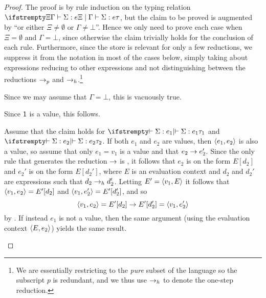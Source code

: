 \begin{proof}
The proof is by rule induction on the typing relation $\typerel{\Xi}{\Gamma}{\Sigma}{e}{\tau}$, but the claim to be proved is augmented by \enquote{or either $\Xi \neq \emptyset$ or $\Gamma \neq \bot$}. Hence we only need to prove each case when $\Xi = \emptyset$ and $\Gamma = \bot$, since otherwise the claim trivially holds for the conclusion of each rule. Furthermore, since the store is relevant for only a few reductions, we suppress it from the notation in most of the cases below, simply taking about expressions reducing to other expressions and not distinguishing between the reductions $\to_p$ and $\to_h$.\footnote{We are essentially restricting to the \emph{pure} subset of the language so the subscript $p$ is redundant, and we thus use $\to_h$ to denote the one-step reduction.}
%
\begin{proofsec}
    \item[\ruleref{Tvar}]
    Since we may assume that $\Gamma = \bot$, this is vacuously true.

    \item[\ruleref{Tunit}]
    Since $\mathsf{1}$ is a value, this follows.

    \item[\ruleref{Tpair}]
    Assume that the claim holds for $\typerel{}{}{\Sigma}{e_1}{\tau_1}$ and $\typerel{}{}{\Sigma}{e_2}{\tau_2}$. If both $e_1$ and $e_2$ are values, then $\langle\textcolor{black}{e_1},\textcolor{black}{e_2}\rangle$ is also a value, so assume that only $e_1 = v_1$ is a value and that $e_2 \to e_2'$. Since the only rule that generates the reduction $\to$ is , it follows that $e_2$ is on the form $E[d_2]$ and $e_2'$ is on the form $E[d_2']$, where $E$ is an evaluation context and $d_2$ and $d_2'$ are expressions such that $d_2 \to_h d_2'$. Letting $E' = \langle\textcolor{black}{v_1},\textcolor{black}{E}\rangle$ it follows that $\langle\textcolor{black}{v_1},\textcolor{black}{e_2}\rangle = E'[d_2]$ and $\langle\textcolor{black}{v_1},\textcolor{black}{e_2'}\rangle = E'[d_2']$, and so
    \begin{equation*}
        \langle\textcolor{black}{v_1},\textcolor{black}{e_2}\rangle
            = E'[d_2]
            \to E'[d_2']
            = \langle\textcolor{black}{v_1},\textcolor{black}{e_2'}\rangle
    \end{equation*}
    by . If instead $e_1$ is not a value, then the same argument (using the evaluation context $\langle\textcolor{black}{E},\textcolor{black}{e_2}\rangle$) yields the same result.


\end{proofsec}
\end{proof}
